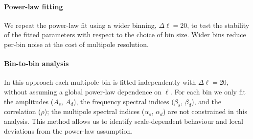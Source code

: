 \paragraph{Power-law fitting}
We repeat the power-law fit using a wider binning, $\Delta\ell = 20$, to test the stability of the fitted parameters with respect to the choice of bin size. Wider bins reduce per-bin noise at the cost of multipole resolution.

\paragraph{Bin-to-bin analysis}
In this approach each multipole bin is fitted independently with $\Delta\ell = 20$, without assuming a global power-law dependence on $\ell$. For each bin we only fit the amplitudes ($A_s$, $A_d$), the frequency spectral indices ($\beta_s$, $\beta_d$), and the correlation ($\rho$); the multipole spectral indices ($\alpha_s$, $\alpha_d$) are not constrained in this analysis. This method allows us to identify scale-dependent behaviour and local deviations from the power-law assumption.


